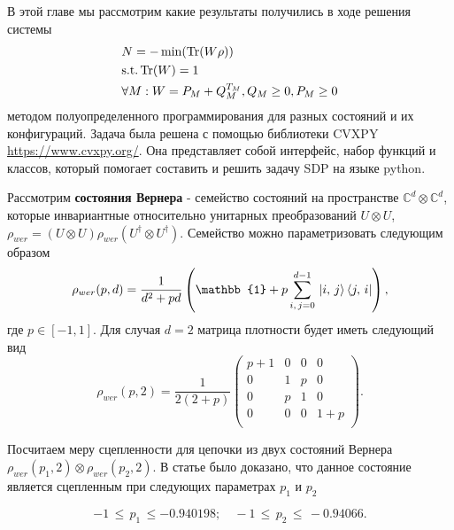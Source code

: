 В этой главе мы рассмотрим какие результаты 
получились в ходе решения системы 
\begin{equation}
\begin{split}
    & N = - \min (\Tr(W \rho)) \\
    & \text{s.t.} \Tr(W) = 1 \\
    & \forall M: W = P_M + Q_M^{T_M}, Q_M \geq 0, P_M \geq 0
\end{split}
\end{equation}
методом полуопределенного программирования для разных состояний и их конфигураций.
Задача была решена с помощью библиотеки CVXPY \url{https://www.cvxpy.org/}. Она представляет собой интерфейс, набор функций и классов, который помогает составить и решить задачу SDP на языке python.


Рассмотрим \textbf{состояния Вернера} \cite{PhysRevA.40.4277} - семейство состояний на пространстве $\mathbb{C}^d\otimes\mathbb{C}^d$, которые инвариантные относительно унитарных преобразований $U \otimes U$, $\rho_{wer} = (U \otimes U)\rho_{wer} (U^{\dag} \otimes U^{\dag})$. Семейство можно параметризовать следующим образом
\begin{equation}\label{werner-state-def}
    \rho_{wer}(p,d) = \frac1{d^2 + pd}\left(\mathbb{1} + p\sum_{i,\,j=0}^{d-1}\,\ket{i,\,j}\bra{j,\,i}\right),
\end{equation}
где $p \in [-1, 1]$. Для случая $d=2$ матрица плотности будет иметь следующий вид
\begin{equation}\label{werner-state}
    \rho_{wer}(p, 2) = \frac{1}{2(2 + p)}
    \begin{pmatrix}
        p+1 & 0 & 0 & 0 \\
        0 & 1 & p & 0 \\
        0 & p & 1 & 0 \\
        0 & 0 & 0 & 1+p \\
    \end{pmatrix}.
\end{equation}

Посчитаем меру сцепленности для цепочки из двух состояний Вернера $\rho_{wer}(p_1,2) \otimes \rho_{wer}(p_2,2)$. В статье \cite{sun-chen-21} было доказано, что данное состояние является сцепленным при следующих параметрах $p_1$ и $p_2$

\begin{equation}\label{2-warn-states-entang-region}
    -1\,\leqslant\,p_1\,\leqslant -0.940198;\quad -1\,\leqslant\,p_2\,\leqslant\,-0.94066.
\end{equation}

